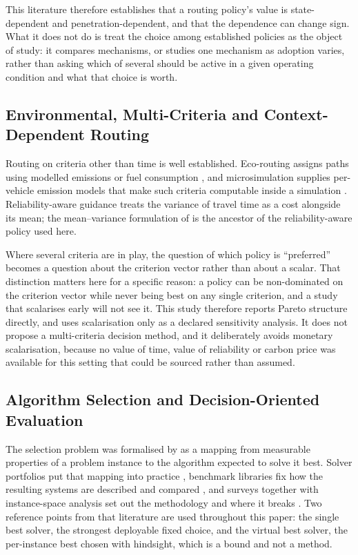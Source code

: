 This literature therefore establishes that a routing policy's value is
state-dependent and penetration-dependent, and that the dependence can change
sign. What it does not do is treat the choice among established policies as the
object of study: it compares mechanisms, or studies one mechanism as adoption
varies, rather than asking which of several should be active in a given
operating condition and what that choice is worth.

\subsection{Environmental, Multi-Criteria and Context-Dependent Routing}
\label{sec:lit:multi}

Routing on criteria other than time is well established. Eco-routing assigns
paths using modelled emissions or fuel consumption
\citep{boriboonsomsin2012eco}, and microsimulation supplies per-vehicle emission
models that make such criteria computable inside a simulation
\citep{krajzewicz2015emissions}. Reliability-aware guidance treats the variance
of travel time as a cost alongside its mean; the mean--variance formulation of
\citet{sen2001meanvariance} is the ancestor of the reliability-aware policy used
here.

Where several criteria are in play, the question of which policy is
``preferred'' becomes a question about the criterion vector rather than about a
scalar. That distinction matters here for a specific reason: a policy can be
non-dominated on the criterion vector while never being best on any single
criterion, and a study that scalarises early will not see it. This study
therefore reports Pareto structure directly, and uses scalarisation only as a
declared sensitivity analysis. It does not propose a multi-criteria decision
method, and it deliberately avoids monetary scalarisation, because no value of
time, value of reliability or carbon price was available for this setting that
could be sourced rather than assumed.

\subsection{Algorithm Selection and Decision-Oriented Evaluation}
\label{sec:lit:as}

The selection problem was formalised by \citet{rice1976} as a mapping from
measurable properties of a problem instance to the algorithm expected to solve
it best. Solver portfolios put that mapping into practice
\citep{xu2008satzilla}, benchmark libraries fix how the resulting systems are
described and compared \citep{bischl2016aslib}, and surveys together with
instance-space analysis set out the methodology and where it breaks
\citep{kotthoff2014survey,smithmiles2009,smithmiles2014instance}. Two reference
points from that literature are used throughout this paper: the single best
solver, the strongest deployable fixed choice, and the virtual best solver, the
per-instance best chosen with hindsight, which is a bound and not a method.

